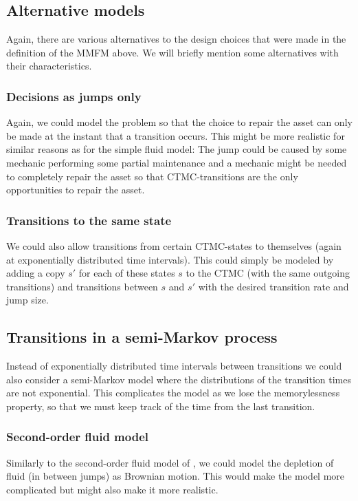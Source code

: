 \subsection{Alternative models}
Again, there are various alternatives to the design choices that were made in the definition of the MMFM above.
We will briefly mention some alternatives with their characteristics.

\subsubsection{Decisions as jumps only}
Again, we could model the problem so that the choice to repair the asset can only be made at the instant that a transition occurs.
This might be more realistic for similar reasons as for the simple fluid model: The jump could be caused by some mechanic performing some partial maintenance and a mechanic might be needed to completely repair the asset so that CTMC-transitions are the only opportunities to repair the asset.

\subsubsection{Transitions to the same state}
We could also allow transitions from certain CTMC-states to themselves (again at exponentially distributed time intervals).
This could simply be modeled by adding a copy $s'$ for each of these states $s$ to the CTMC (with the same outgoing transitions) and transitions between $s$ and $s'$ with the desired transition rate and jump size.

\subsection{Transitions in a semi-Markov process}
Instead of exponentially distributed time intervals between transitions we could also consider a semi-Markov model where the distributions of the transition times are not exponential.
This complicates the model as we lose the memorylessness property, so that we must keep track of the time from the last transition.

\subsubsection{Second-order fluid model}
Similarly to the second-order fluid model of \cite{Gribaudo2007}, we could model the depletion of fluid (in between jumps) as Brownian motion.
This would make the model more complicated but might also make it more realistic.